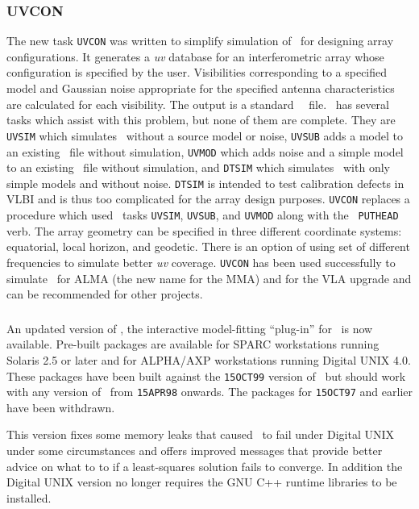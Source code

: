 \subsubsection{UVCON}

   The new task {\tt UVCON} was written to simplify simulation of
\uvdata\ for designing array configurations.  It generates a {\it uv}
database for an interferometric array whose configuration is specified
by the user. Visibilities corresponding to a specified model and
Gaussian noise appropriate for the specified antenna characteristics
are calculated for each visibility.  The output is a standard \AIPS\
\uvdata\ file.  \AIPS\ has several tasks which assist with this
problem, but none of them are complete.  They are {\tt UVSIM} which
simulates \uvdata\ without a source model or noise, {\tt UVSUB} adds
a model to an existing \uvdata\ file without simulation, {\tt UVMOD}
which adds noise and a simple model to an existing \uvdata\ file
without simulation, and {\tt DTSIM} which simulates \uvdata\ with only
simple models and without noise.  {\tt DTSIM} is intended to test
calibration defects in VLBI and is thus too complicated for the array
design purposes.  {\tt UVCON} replaces a procedure which used \AIPS\
tasks {\tt UVSIM}, {\tt UVSUB}, and {\tt UVMOD} along with the {\tt
PUTHEAD} verb.  The array geometry can be specified in three different
coordinate systems: equatorial, local horizon, and geodetic. There is
an option of using set of different frequencies to simulate better
{\it uv} coverage.  {\tt UVCON} has been used successfully to
simulate \uvdata\ for ALMA (the new name for the MMA) and for the VLA
upgrade and can be recommended for other projects.

\subsubsection{\SLIME}

     An updated version of \SLIME, the interactive model-fitting
``plug-in'' for \AIPS\ is now available.  Pre-built packages are
available for SPARC workstations running Solaris 2.5 or later and for
ALPHA/AXP workstations running Digital UNIX 4.0.  These packages have
been built against the {\tt 15OCT99} version of \AIPS\ but should work
with any version of \AIPS\ from {\tt 15APR98} onwards. The packages
for {\tt 15OCT97} and earlier have been withdrawn.

This version fixes some memory leaks that caused \SLIME\ to fail under
Digital UNIX under some circumstances and offers improved messages
that provide better advice on what to to if a least-squares solution
fails to converge.  In addition the Digital UNIX version no longer
requires the GNU C++ runtime libraries to be installed.

